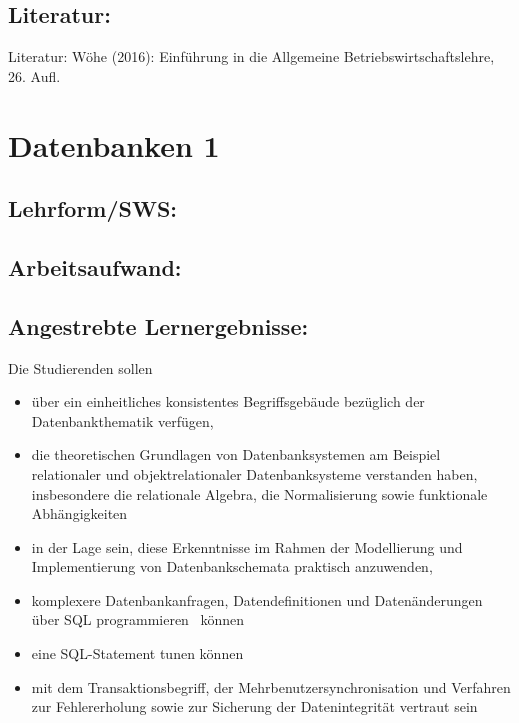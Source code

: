 \section{Literatur:}\label{literatur-6}

Literatur: Wöhe (2016): Einführung in die Allgemeine
Betriebswirtschaftslehre, 26. Aufl.

\chapter{Datenbanken 1}\label{datenbanken-1}

\section{Lehrform/SWS:}\label{lehrformsws-7}

\section{Arbeitsaufwand:}\label{arbeitsaufwand-7}

\section{Angestrebte
Lernergebnisse:}\label{angestrebte-lernergebnisse-7}

Die Studierenden sollen

\begin{itemize}
\item
  über ein einheitliches konsistentes Begriffsgebäude bezüglich der
  Datenbankthematik verfügen,
\item
  die theoretischen Grundlagen von Datenbanksystemen am Beispiel
  relationaler und objektrelationaler Datenbanksysteme verstanden haben,
  insbesondere die relationale Algebra, die Normalisierung sowie
  funktionale Abhängigkeiten
\item
  in der Lage sein, diese Erkenntnisse im Rahmen der Modellierung und
  Implementierung von Datenbankschemata praktisch anzuwenden,
\item
  komplexere Datenbankanfragen, Datendefinitionen und Datenänderungen
  über SQL programmieren~ können
\item
  eine SQL-Statement tunen können
\item
  mit dem Transaktionsbegriff, der Mehrbenutzersynchronisation und
  Verfahren zur Fehlererholung sowie zur Sicherung der Datenintegrität
  vertraut sein
\end{itemize}

